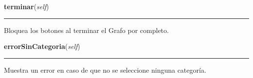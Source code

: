     \label{grafo:Grafo:terminar}

    \vspace{0.5ex}

\hspace{.8\funcindent}\begin{boxedminipage}{\funcwidth}

    \raggedright \textbf{terminar}(\textit{self})

    \vspace{-1.5ex}

    \rule{\textwidth}{0.5\fboxrule}
\setlength{\parskip}{2ex}
    Bloquea los botones al terminar el Grafo por completo.

\setlength{\parskip}{1ex}
    \end{boxedminipage}

    \label{grafo:Grafo:errorSinCategoria}

    \vspace{0.5ex}

\hspace{.8\funcindent}\begin{boxedminipage}{\funcwidth}

    \raggedright \textbf{errorSinCategoria}(\textit{self})

    \vspace{-1.5ex}

    \rule{\textwidth}{0.5\fboxrule}
\setlength{\parskip}{2ex}
    Muestra un error en caso de que no se seleccione ninguna categoría.

\setlength{\parskip}{1ex}
    \end{boxedminipage}

    \label{grafo:Grafo:dibujar}

    \vspace{0.5ex}

